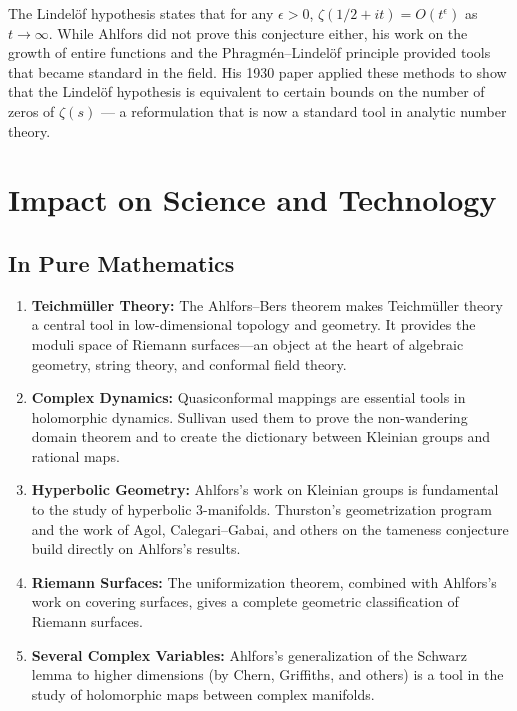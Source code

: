 The Lindel{\"o}f hypothesis states that for any $\epsilon > 0$, $\zeta(1/2 + it) = O(t^\epsilon)$ as $t \to \infty$. While Ahlfors did not prove this conjecture either, his work on the growth of entire functions and the Phragm{\'e}n--Lindel{\"o}f principle provided tools that became standard in the field. His 1930 paper applied these methods to show that the Lindel{\"o}f hypothesis is equivalent to certain bounds on the number of zeros of $\zeta(s)$ --- a reformulation that is now a standard tool in analytic number theory.

\section{Impact on Science and Technology}

\subsection{In Pure Mathematics}

\begin{enumerate}
    \item \textbf{Teichm{\"u}ller Theory:} The Ahlfors--Bers theorem makes Teichm{\"u}ller theory a central tool in low-dimensional topology and geometry. It provides the moduli space of Riemann surfaces---an object at the heart of algebraic geometry, string theory, and conformal field theory.
    \item \textbf{Complex Dynamics:} Quasiconformal mappings are essential tools in holomorphic dynamics. Sullivan used them to prove the non-wandering domain theorem and to create the dictionary between Kleinian groups and rational maps.
    \item \textbf{Hyperbolic Geometry:} Ahlfors's work on Kleinian groups is fundamental to the study of hyperbolic 3-manifolds. Thurston's geometrization program and the work of Agol, Calegari--Gabai, and others on the tameness conjecture build directly on Ahlfors's results.
    \item \textbf{Riemann Surfaces:} The uniformization theorem, combined with Ahlfors's work on covering surfaces, gives a complete geometric classification of Riemann surfaces.
    \item \textbf{Several Complex Variables:} Ahlfors's generalization of the Schwarz lemma to higher dimensions (by Chern, Griffiths, and others) is a tool in the study of holomorphic maps between complex manifolds.
\end{enumerate}

